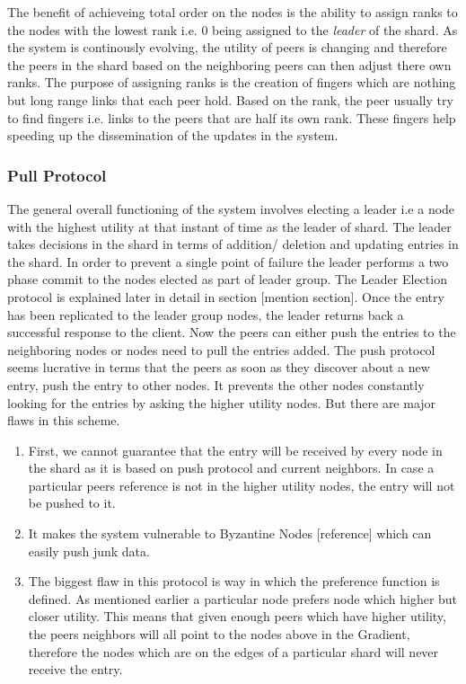 \documentclass[a4paper, 11pt]{article}
\begin{document}
\par The benefit of achieveing total order on the nodes is the ability to assign ranks to the nodes with the lowest rank i.e. 0 being assigned to the \textit{leader} of the shard. As the system is continously evolving, the utility of peers is changing and therefore the peers in the shard based on the neighboring peers can then adjust there own ranks. The purpose of assigning ranks is the creation of fingers which are nothing but long range links that each peer hold. Based on the rank, the peer usually try to find fingers i.e. links to the peers that are half its own rank. These fingers help speeding up the dissemination of the updates in the system.


\subsubsection*{Pull Protocol}

The general overall functioning of the system involves electing a leader i.e a node with the highest utility at that instant of time as the leader of shard. The leader takes decisions in the shard in terms of addition/ deletion and updating entries in the shard. In order to prevent a single point of failure the leader performs a two phase commit to the nodes elected as part of leader group. The Leader Election protocol is explained later in detail in section [mention section]. Once the entry has been replicated to the leader group nodes, the leader returns back a successful response to the client. Now the peers can either push the entries to the neighboring nodes or nodes need to pull the entries added. The push protocol seems lucrative in terms that the peers as soon as they discover about a new entry, push the entry to other nodes. It prevents the other nodes constantly looking for the entries by asking the higher utility nodes. But there are major flaws in this scheme.

\begin{enumerate}

\item First, we cannot guarantee that the entry will be received by every node in the shard as it is based on push protocol and current neighbors. In case a particular peers reference is not in the higher utility nodes, the entry will not be pushed to it.

\item It makes the system vulnerable to Byzantine Nodes [reference] which can easily push junk data.

\item The biggest flaw in this protocol is way in which the preference function is defined. As mentioned earlier a particular node prefers node which higher but closer utility. This means that given enough peers which have higher utility, the peers neighbors will all point to the nodes above in the Gradient, therefore the nodes which are on the edges of a particular shard will never receive the entry.

\end{enumerate} 
\end{document}
